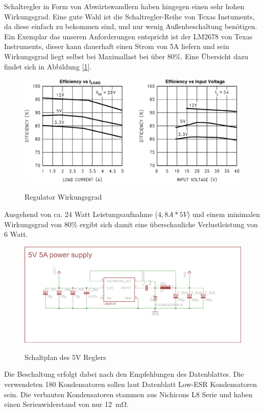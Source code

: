 Schaltregler in Form von Abwärtswandlern haben hingegen einen sehr hohen Wirkungsgrad. Eine gute Wahl ist die Schaltregler-Reihe von Texas Instuments, da diese einfach zu bekommen sind,
und nur wenig Außenbeschaltung benötigen. Ein Exemplar das unseren Anforderungen entspricht ist der LM2678 von Texas Instruments, dieser kann dauerhaft einen Strom von 5A liefern und sein Wirkungsgrad
liegt selbst bei Maximallast bei über 80\%.
Eine Übersicht dazu findet sich in Abbildung [\ref{fig:vreg-eff}].
\begin{figure}[H]
\centering
\includegraphics[width=.8\textwidth]{vreg.png}\\
\caption{Regulator Wirkungsgrad \cite{ds-ti}}%
\label{fig:vreg-eff}
\end{figure}
Ausgehend von ca. 24 Watt Leistungsaufnahme ($4,8A*5V$) und einem minimalen Wirkungsgrad von 80\%  ergibt sich damit eine überschauliche Verlustleistung von 6 Watt.


\begin{figure}[H]
\centering
\includegraphics[width=\textwidth]{5vregler.png}\\
\caption{Schaltplan des 5V Reglers}%
\label{fig:vreg}
\end{figure}


Die Beschaltung erfolgt dabei nach den Empfehlungen des Datenblattes. Die verwendeten \SI{180}{\uF} Kondensatoren sollen laut Datenblatt Low-ESR Kondensatoren sein. 
Die verbauten Kondensatoren stammen aus Nichicons L8 Serie und haben einen Serienwiderstand von nur \SI{12}{\mohm}.

